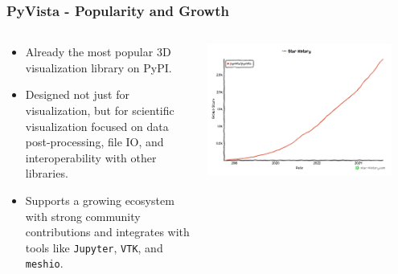 \documentclass[t]{beamer}
\renewcommand{\small}{\footnotesize}
\renewcommand{\footnotesize}{\scriptsize}
\begin{document}
\begin{frame}
    \frametitle{PyVista - Popularity and Growth}

    \begin{center}
        \begin{columns}[T]
            \begin{column}{.6\textwidth}
                \small
                \begin{itemize}[leftmargin=10pt, label=•]
                    \item Already the most popular 3D visualization library on PyPI.
                    \item Designed not just for visualization, but for scientific
                          visualization focused on data post-processing, file IO, and
                          interoperability with other libraries.
                    \item Supports a growing ecosystem with strong community
                          contributions and integrates with tools like \texttt{Jupyter},
                          \texttt{VTK}, and \texttt{meshio}.
                \end{itemize}
            \end{column}

            \begin{column}{.5\textwidth}
                \vspace{-5pt}
                \centering
                \includegraphics[width=0.9\textwidth]{figures/overview-stars-graph.png}
            \end{column}

        \end{columns}


\end{center}
\end{frame}
\end{document}
